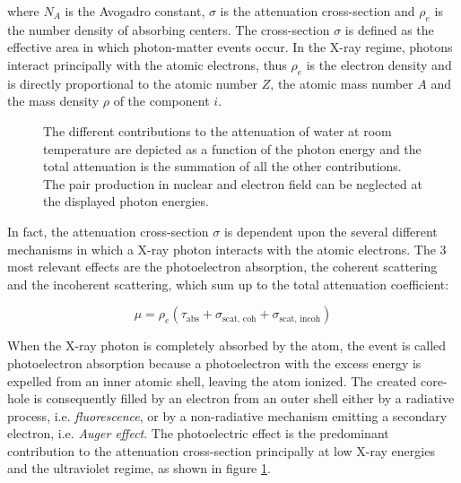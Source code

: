 where $N_A$ is the Avogadro constant, $\sigma$ is the attenuation cross-section and $\rho_e$ is the number density of absorbing centers. The cross-section $\sigma$ is defined as the effective area in which photon-matter events occur. In the X-ray regime, photons interact principally with the atomic electrons, thus $\rho_e$ is the electron density and is directly proportional to the atomic number $Z$, the atomic mass number $A$ and the mass density $\rho$ of the component $i$. 

\begin{figure}%
	\centering
		
		\caption[Contributions to the X-ray attenuation coefficient of water]{The different contributions to the attenuation of water at room temperature are depicted as a function of the photon energy \citep{henke_x-ray_1993} and the total attenuation is the summation of all the other contributions. The pair production in nuclear and electron field can be neglected at the displayed photon energies.}
		\label{fig:AttenuationWater}
\end{figure}

In fact, the attenuation cross-section $\sigma$ is dependent upon the several different mechanisms in which a X-ray photon interacts with the atomic electrons. The 3 most relevant effects are the photoelectron absorption, the coherent scattering and the incoherent scattering, which sum up to the total attenuation coefficient:

\begin{equation}
        \mu = \rho_e (\tau_{\text{abs}}+\sigma_{\text{scat, coh}}+\sigma_{\text{scat, incoh}})
\end{equation}

When the X-ray photon is completely absorbed by the atom, the event is called photoelectron absorption because a photoelectron with the excess energy is expelled from an inner atomic shell, leaving the atom ionized. The created core-hole is consequently filled by an electron from an outer shell either by a radiative process, i.e. \emph{fluorescence}, or by a non-radiative mechanism emitting a secondary electron, i.e. \emph{Auger effect}. The photoelectric effect is the predominant contribution to the attenuation cross-section principally at low X-ray energies and the ultraviolet regime, as shown in figure \ref{fig:AttenuationWater}. 

